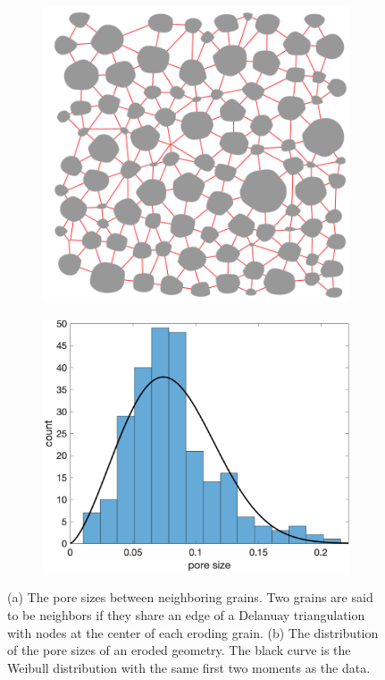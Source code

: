 \documentclass{jfm}
\begin{document}
\begin{figure}
\begin{subfigure}[b]{0.5\textwidth}
\includegraphics*[height =0.8\linewidth]{./figs/triangulation_100b100}
\caption{}
\end{subfigure}
\begin{subfigure}[b]{0.5\textwidth}
\includegraphics*[height = 0.8\linewidth]{./figs/gap_hist100b100}
\caption{}
\end{subfigure}
\caption{\label{fig:Eroding100gap} (a) The pore sizes between
neighboring grains. Two grains are said to be neighbors if they share an
edge of a Delanuay triangulation with nodes at the center of each
eroding grain. (b) The distribution of the pore sizes of an eroded
geometry. The black curve is the Weibull distribution with the same
first two moments as the data.}
\end{figure}
\end{document}
